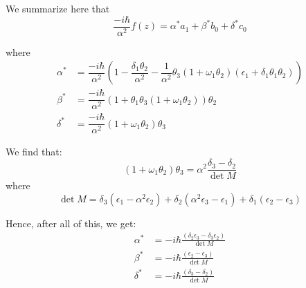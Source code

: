 \documentclass[11pt,a4paper]{article}
\begin{document}
We summarize here that
\begin{equation}
 \dfrac{-i \hbar}{\alpha^2 }f(z)= \alpha^* a_1 + \beta^* b_0 + \delta^* c_0
\end{equation}

where 
\begin{align}
 \alpha^* &= \dfrac{-i \hbar}{\alpha^2 }\left(1   - \dfrac{ \delta_1  \theta_2 }{\alpha^2} -\dfrac{1  }{\alpha^2}\theta_3( 1  +   \omega_1  \theta_2 ) (\epsilon_1 + \delta_1 \theta_1 \theta_2)\right) \\
 \beta^* &= \dfrac{-i \hbar}{\alpha^2 }(1 + \theta_1  \theta_3 (1+   \omega_1   \theta_2   )) \theta_2\\
 \delta^* &=\dfrac{-i \hbar}{\alpha^2 }( 1  +   \omega_1  \theta_2 ) \theta_3
\end{align}

We find that:
\begin{equation}
( 1  +   \omega_1  \theta_2 ) \theta_3= \alpha^2 \dfrac{\delta_3- \delta_2}{\det M}
\end{equation}
where
\begin{equation}
\det M = \delta _3 \left(\epsilon _1-\alpha ^2 \epsilon _2\right)+\delta _2 \left(\alpha ^2 \epsilon _3-\epsilon _1\right)+\delta _1 \left(\epsilon
   _2-\epsilon _3\right)
\end{equation}


Hence, after all of this, we get:
\begin{equation}
\boxed{
\begin{aligned}
 \alpha^* &= - i \hbar \frac{  \left(\delta _2 \epsilon _3 -\delta _3 \epsilon _2\right)}{\det M} \\
  \beta^* &= -i \hbar \frac{ \left(\epsilon _2-\epsilon _3\right) }{\det M} \\
 \delta^*  &=- i \hbar \frac{ \left(\delta _3-\delta _2\right) }{\det M}
\end{aligned}
}
\end{equation}
\end{document}
